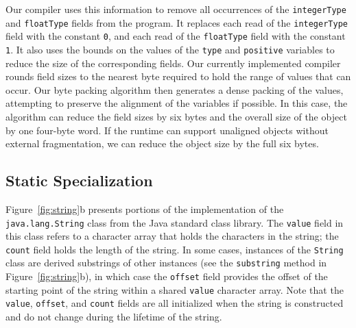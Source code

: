 \documentclass[oribibl]{llncs}
\begin{document}
Our compiler uses this information to remove all occurrences
of the {\tt integerType} and {\tt floatType} fields from the
program. It replaces each read of the {\tt integerType} field
with the constant {\tt 0}, and each read of the {\tt floatType}
field with the constant {\tt 1}. It also uses the bounds on the 
values of the {\tt type} and {\tt positive} variables to reduce the size of the 
corresponding fields. Our currently implemented compiler rounds
field sizes to the nearest byte required to hold the range
of values that can occur. Our byte packing algorithm then 
generates a dense packing of the values, attempting to preserve
the alignment of the variables if possible. In this case, the
algorithm can reduce the field sizes by six bytes and the overall
size of the object by one four-byte word.  If the runtime can support
unaligned objects without external fragmentation, we can reduce the
object size by  the full six bytes.

\subsection{Static Specialization} 

Figure~\ref{fig:string}b presents portions of the implementation
of the {\tt java.lang.String} class from the Java standard class
library. The {\tt value} field in this
class refers to a character array that holds the characters
in the string; the {\tt count} field holds the length of the
string. In some cases, instances of the {\tt String} class
are derived substrings of other instances 
(see the {\tt substring} method in Figure~\ref{fig:string}b), in
which case the
{\tt offset} field provides the offset of the starting 
point of the string within a shared {\tt value} character array. 
Note that the {\tt value}, {\tt offset}, and {\tt count} 
fields are all initialized when the string is constructed
and do not change during the lifetime of the string.
\end{document}
